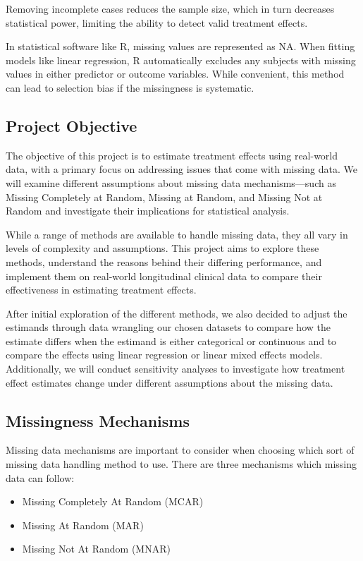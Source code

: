 \documentclass{article}
\providecommand{\tightlist}{%
  \setlength{\itemsep}{0pt}\setlength{\parskip}{0pt}}
\begin{document}
Removing incomplete cases reduces the sample size, which in turn
decreases statistical power, limiting the ability to detect valid
treatment effects.

In statistical software like R, missing values are represented as NA.
When fitting models like linear regression, R automatically excludes any
subjects with missing values in either predictor or outcome variables.
While convenient, this method can lead to selection bias if the
missingness is systematic.

\subsection{Project Objective}\label{project-objective}

The objective of this project is to estimate treatment effects using
real-world data, with a primary focus on addressing issues that come
with missing data. We will examine different assumptions about missing
data mechanisms---such as Missing Completely at Random, Missing at
Random, and Missing Not at Random and investigate their implications for
statistical analysis.

While a range of methods are available to handle missing data, they all
vary in levels of complexity and assumptions. This project aims to
explore these methods, understand the reasons behind their differing
performance, and implement them on real-world longitudinal clinical data
to compare their effectiveness in estimating treatment effects.

After initial exploration of the different methods, we also decided to
adjust the estimands through data wrangling our chosen datasets to
compare how the estimate differs when the estimand is either categorical
or continuous and to compare the effects using linear regression or
linear mixed effects models. Additionally, we will conduct sensitivity
analyses to investigate how treatment effect estimates change under
different assumptions about the missing data.

\subsection{Missingness Mechanisms}\label{missingness-mechanisms}

Missing data mechanisms are important to consider when choosing which
sort of missing data handling method to use. There are three mechanisms
which missing data can follow:

\begin{itemize}
\tightlist
\item
  Missing Completely At Random (MCAR)
\item
  Missing At Random (MAR)
\item
  Missing Not At Random (MNAR)
\end{itemize}
\end{document}

